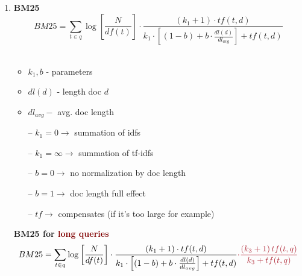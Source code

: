 \begin{enumerate}
\begin{itemize}
\begin{itemize}
        \end{itemize}
    \end{itemize}
    \item \textbf{BM25}
    $$
    B M 25=\sum_{t \in q} \log \left[\frac{N}{d f(t)}\right] \cdot \frac{\left(k_{1}+1\right) \cdot t f(t, d)}{k_{1} \cdot\left[(1-b)+b \cdot \frac{d l(d)}{d l_{a v g}}\right]+t f(t, d)}
    $$
    \\
    \begin{minipage}{0.35\textwidth}
        \begin{itemize}
            \setlength\itemsep{0em}
            \item $k_{1}, b$ - parameters
            \item $d l(d)$ - length doc $d$
            \item $d l_{a v g}-$ avg. doc length
            \\
        \end{itemize}
    \end{minipage}
    \begin{minipage}{0.65\textwidth}
        \begin{itemize}
            \setlength\itemsep{0em}
            \item[--] $k_{1} = 0 \rightarrow $ summation of idfs 
            \item[--] $k_{1} = \infty \rightarrow $ summation of tf-idfs
            \item[--] $b = 0 \rightarrow $ no normalization by doc length 
            \item[--] $b = 1 \rightarrow $ doc length full effect
            \item[--] $tf \rightarrow $ compensates (if it's too large for example)
        \end{itemize}
    \end{minipage}
    
    \textbf{BM25 for \textcolor{Maroon}{long queries}} 
    $$
    B M 25=\sum_{t \in q} \log \left[\frac{N}{d f(t)}\right] \cdot \frac{\left(k_{1}+1\right) \cdot t f(t, d)}{k_{1} \cdot\left[(1-b)+b \cdot \frac{d l(d)}{d l_{a v g}}\right]+t f(t, d)} \textcolor{Maroon}{\cdot \frac{\left(k_{3}+1\right) t f(t, q)}{k_{3}+t f(t, q)}}
    $$
\end{enumerate}

